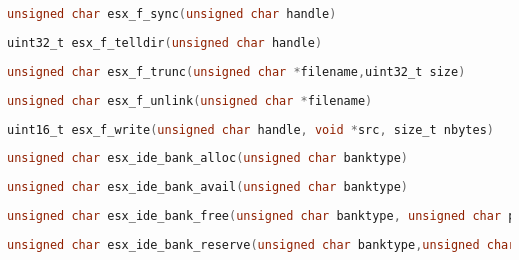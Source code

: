 \documentclass[11pt]{book}
\def\lthtmlcheckvsize{\ifdim\ht\sizebox<\vsize 
  \ifdim\wd\sizebox<\hsize\expandafter\hfill\fi \expandafter\vfill
  \else\expandafter\vss\fi}%
\begin{document}
{\newpage\clearpage
{}%
\begin{lstlisting}[language=C]
unsigned char esx_f_sync(unsigned char handle)
\end{lstlisting}%
\lthtmlfigureZ
\lthtmlcheckvsize\clearpage}

{\newpage\clearpage
{}%
\begin{lstlisting}[language=C]
uint32_t esx_f_telldir(unsigned char handle)
\end{lstlisting}%
\lthtmlfigureZ
\lthtmlcheckvsize\clearpage}

{\newpage\clearpage
{}%
\begin{lstlisting}[language=C]
unsigned char esx_f_trunc(unsigned char *filename,uint32_t size)
\end{lstlisting}%
\lthtmlfigureZ
\lthtmlcheckvsize\clearpage}

{\newpage\clearpage
{}%
\begin{lstlisting}[language=C]
unsigned char esx_f_unlink(unsigned char *filename)
\end{lstlisting}%
\lthtmlfigureZ
\lthtmlcheckvsize\clearpage}

{\newpage\clearpage
{}%
\begin{lstlisting}[language=C]
uint16_t esx_f_write(unsigned char handle, void *src, size_t nbytes)
\end{lstlisting}%
\lthtmlfigureZ
\lthtmlcheckvsize\clearpage}

{\newpage\clearpage
{}%
\begin{lstlisting}[language=C]
unsigned char esx_ide_bank_alloc(unsigned char banktype)
\end{lstlisting}%
\lthtmlfigureZ
\lthtmlcheckvsize\clearpage}

{\newpage\clearpage
{}%
\begin{lstlisting}[language=C]
unsigned char esx_ide_bank_avail(unsigned char banktype)
\end{lstlisting}%
\lthtmlfigureZ
\lthtmlcheckvsize\clearpage}

{\newpage\clearpage
{}%
\begin{lstlisting}[language=C]
unsigned char esx_ide_bank_free(unsigned char banktype, unsigned char page)
\end{lstlisting}%
\lthtmlfigureZ
\lthtmlcheckvsize\clearpage}

{\newpage\clearpage
{}%
\begin{lstlisting}[language=C]
unsigned char esx_ide_bank_reserve(unsigned char banktype,unsigned char page)
\end{lstlisting}%
\lthtmlfigureZ
\lthtmlcheckvsize\clearpage}
\end{document}
